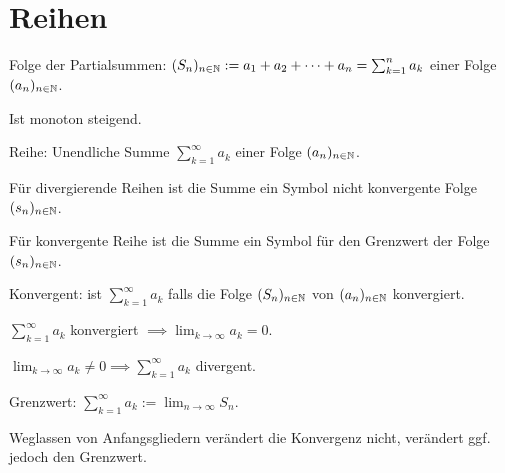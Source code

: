 \section{Reihen}
\begin{compactdesc}
    \item[Folge der Partialsummen:] $(S_n)_{n \in \mathbb{N}} := a_1 + a_2 + \dots + a_n = \sum_{k=1}^{n} a_k$ einer Folge $(a_n)_{n \in \mathbb{N}}$.
        \begin{compactitem}
            \item Ist monoton steigend.
        \end{compactitem}
    \item[Reihe:] Unendliche Summe $\sum_{k=1}^{\infty} a_k$ einer Folge $(a_n)_{n \in \mathbb{N}}$.
        \begin{compactitem}
            \item Für divergierende Reihen ist die Summe ein Symbol nicht konvergente Folge $(s_n)_{n \in \mathbb{N}}$.
            \item Für konvergente Reihe ist die Summe ein Symbol für den Grenzwert der Folge $(s_n)_{n \in \mathbb{N}}$.
        \end{compactitem}
    \item[Konvergent:] ist $\sum_{k=1}^{\infty} a_k$ falls die Folge $(S_n)_{n \in \mathbb{N}}$ von $(a_n)_{n \in \mathbb{N}}$ konvergiert.
        \begin{compactitem}
            \item $\sum_{k=1}^{\infty} a_k$ konvergiert $\implies \lim_{k \to \infty} a_k = 0 $.
            \item $\lim_{k \to \infty} a_k \neq  0 \implies \sum_{k=1}^{\infty} a_k$ divergent.
        \end{compactitem}
    \item[Grenzwert:] $\sum_{k=1}^{\infty} a_k := \lim_{n \to \infty} S_n$.
    \item Weglassen von Anfangsgliedern verändert die Konvergenz nicht, verändert ggf. jedoch den Grenzwert.
\end{compactdesc}


